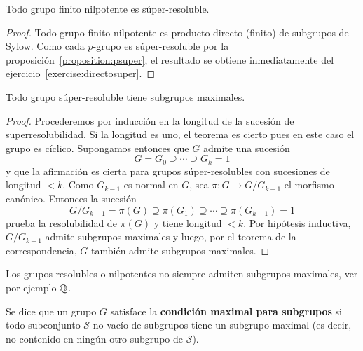 \begin{corollary}
	Todo grupo finito nilpotente es súper-resoluble.
\end{corollary}

\begin{proof}
	Todo grupo finito nilpotente es producto directo (finito) de subgrupos de
	Sylow. Como cada $p$-grupo es súper-resoluble por la
	proposición~\ref{proposition:psuper}, el resultado se obtiene
	inmediatamente del ejercicio~\ref{exercise:directosuper}.
\end{proof}

\begin{theorem}
	Todo grupo súper-resoluble tiene subgrupos maximales.	
\end{theorem}

\begin{proof}
	Procederemos por inducción en la longitud de la sucesión de
	superresolubilidad. Si la longitud es uno, el teorema es cierto pues en
	este caso el grupo es cíclico. Supongamos entonces que $G$ admite una
	sucesión
	\[
		G=G_0\supseteq\cdots\supseteq G_k=1
	\]
	y que la afirmación es cierta para grupos súper-resolubles con sucesiones 
	de longitud $<k$. Como $G_{k-1}$ es normal en $G$, sea $\pi\colon G\to
	G/G_{k-1}$ el morfismo canónico. Entonces la sucesión
	\[
		G/G_{k-1}=\pi(G)\supseteq \pi(G_1)\supseteq\cdots\supseteq\pi(G_{k-1})=1
	\]
	prueba la resolubilidad de $\pi(G)$ y tiene longitud $<k$. Por hipótesis
	inductiva, $G/G_{k-1}$ admite subgrupos maximales y luego, por el teorema
	de la correspondencia, $G$ también admite subgrupos maximales.
\end{proof}

Los grupos resolubles o nilpotentes no siempre admiten
subgrupos maximales, ver por ejemplo $\mathbb{Q}$.

\begin{definition}
	Se dice que un grupo $G$ satisface la \textbf{condición maximal para
	subgrupos} si 
	todo subconjunto $\mathcal{S}$ no vacío de subgrupos tiene un subgrupo
	maximal (es decir, no contenido en ningún otro subgrupo de $\mathcal{S}$). 
\end{definition}


